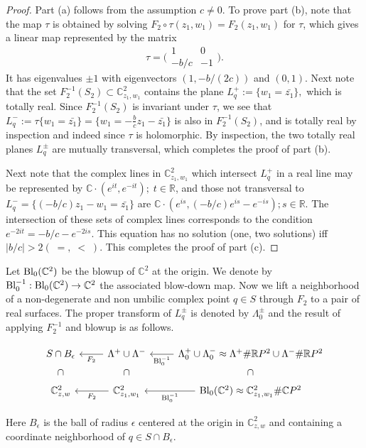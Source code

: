 \documentclass{amsart}
\newcommand{\be}{\begin{equation}}
\newcommand{\ee}{\end{equation}}
\begin{document}
\begin{proof}
    Part (a) follows from the assumption $c \neq 0$. To prove part (b), note that the map $\tau$  is obtained by solving $F_2 \circ \tau (z_1, w_1)=F_2(z_1,w_1)$ for $\tau$, which gives a linear map represented by the matrix
\be\label{matrixtau}
\tau=\bigg(\begin{array}{cc} 1 & 0 \\ -b/c & -1\end{array}\bigg).
\ee
It has eigenvalues $\pm 1$ with eigenvectors $(1 , -b/(2c) )$ and  $(0, 1)$. Next note that the set $F_2^{-1}( S_2)\subset {\mathbb{C}}^2_{z_1,w_1}$ contains the plane $L_ q^+:= \{w_1=\bar{z_1}\},$ which is totally real. Since $F_2^{-1}( S_2)$ is invariant under $\tau$, we see that $L_ q^-:= \tau \{ w_1=\bar{z_1} \}=\{w_1 =-\frac{b}{c}z_1-\bar{z_1}  \}$ is also in $F_2^{-1}( S_2)$, and is totally real by inspection and indeed since $\tau$ is holomorphic. By inspection, the two totally real planes $L_ q^{\pm}$ are mutually transversal, which completes the proof of part (b). 

Next note that the complex lines in ${\mathbb{C}}^2_{z_1,w_1}$ which intersect $L_ q^+$ in a real line may be represented by ${\mathbb{C}} \cdot (e^{it}, e^{-it}) ; \;t \in {\mathbb{R}} $, and those not transversal to $L_ q^-=\{ (- b/c ) z_1-w_1=\bar{z_1}\}$ are ${\mathbb{C}} \cdot (e^{is},(- b/c) e^{is}-e^{-is} ) ; s \in {\mathbb{R}} $. The intersection of these sets of complex lines corresponds to the condition $e^{-2it} =-b/c -e^{-2is}$. This equation has no solution (one, two solutions) iff $|b /c|  > 2 (\;=, \; <\; )$. This completes the proof of part (c). 

\end{proof} 

Let $\rm{Bl}_0(\mathbb{C}^2)$ be the blowup  of $\mathbb{C}^2$ at the origin. We denote by  $\rm{Bl}_0^{-1} : \rm{Bl}_0(\mathbb{C}^2) \to \mathbb{C}^2$ the associated blow-down map.
Now we lift a neighborhood of a non-degenerate and non umbilic complex point $ q \in  S$ through $F_2$ to a pair of  real surfaces.  
The proper transform of $L_q^\pm$ is denoted by 
$\Lambda_0^\pm$ and the result of applying $F_2^{-1}$ and blowup is as follows.
\vspace{0.1in}
\begin{center} 
\begin{equation}  \label{diag}
    \begin{tikzcd} 
 S \cap B_\epsilon  &    \Lambda^+ \cup \Lambda^-\arrow[l,"F_2"]  &\Lambda_0^+ \cup \Lambda_0^- \approx  \Lambda^+\# {\mathbb{R}}P^2 \cup \Lambda^-\# {\mathbb{R}}P^2 \arrow[l, "\rm{Bl}_0^{-1}"] \\[-15pt]
\cap& \cap &\cap \\[-15pt]
{\mathbb{C}}^2_{z,w}&{\mathbb{C}}^2_{z_1,w_1}\arrow[l,"F_2"]&{\rm{Bl}}_0({\mathbb{C}}^2) \approx {\mathbb{C}}^2_{z_1,w_1} \# {\mathbb{C}}P^2\arrow[l, "\rm{Bl}_0^{-1}"]
\end{tikzcd}
\end{equation}
\end{center}
Here $B_\epsilon$ is the ball of radius $\epsilon$ centered at the origin in ${\mathbb C}^2_{z,w}$ and containing a coordinate neighborhood of $q \in S \cap B_\epsilon$.
\end{document}
